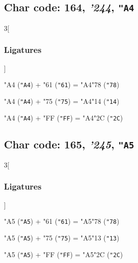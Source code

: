 \documentclass{article}
\newlength{\maxcharwidth}
\begin{document}
\subsection{Char code: 164, {\it'244}, {\tt"A4}}
\label{char_164}


\begin{multicols}{3}[\subsubsection{Ligatures}]

{\testfont\char"A4\noboundary} ({\tt"A4}) + {\testfont\char"61\noboundary} ({\tt"61}) = {\testfont\char"A4\noboundary}{\testfont\char"78\noboundary} ({\tt"78}) 

{\testfont\char"A4\noboundary} ({\tt"A4}) + {\testfont\char"75\noboundary} ({\tt"75}) = {\testfont\char"A4\noboundary}{\testfont\char"14\noboundary} ({\tt"14}) 

{\testfont\char"A4\noboundary} ({\tt"A4}) + {\testfont\char"FF\noboundary} ({\tt"FF}) = {\testfont\char"A4\noboundary}{\testfont\char"2C\noboundary} ({\tt"2C}) 

\end{multicols}

\subsection{Char code: 165, {\it'245}, {\tt"A5}}
\label{char_165}


\begin{multicols}{3}[\subsubsection{Ligatures}]

{\testfont\char"A5\noboundary} ({\tt"A5}) + {\testfont\char"61\noboundary} ({\tt"61}) = {\testfont\char"A5\noboundary}{\testfont\char"78\noboundary} ({\tt"78}) 

{\testfont\char"A5\noboundary} ({\tt"A5}) + {\testfont\char"75\noboundary} ({\tt"75}) = {\testfont\char"A5\noboundary}{\testfont\char"13\noboundary} ({\tt"13}) 

{\testfont\char"A5\noboundary} ({\tt"A5}) + {\testfont\char"FF\noboundary} ({\tt"FF}) = {\testfont\char"A5\noboundary}{\testfont\char"2C\noboundary} ({\tt"2C}) 

\end{multicols}
\end{document}
